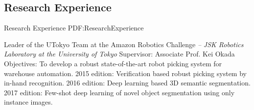 \documentclass[letterpaper,MMMyyyy,nonstop]{simpleresumecv}
\begin{document}
\begin{body}
%
%
%


\section
{Research Experience}
{Research Experience}
{PDF:ResearchExperience}

Leader of the UTokyo Team at the Amazon Robotics Challenge
\hfill
\textit{ -- }
\newline
\textit{JSK Robotics Laboratory at the University of Tokyo}
\newline
Supervisor: Associate Prof. Kei Okada
\newline
Objectives: To develop a robust state-of-the-art robot picking system for warehouse automation.
2015 edition: Verification based robust picking system by in-hand recognition.
2016 edition: Deep learning based 3D semantic segmentation.
2017 edition: Few-shot deep learning of novel object segmentation using only instance images.


\end{body}
\end{document}
